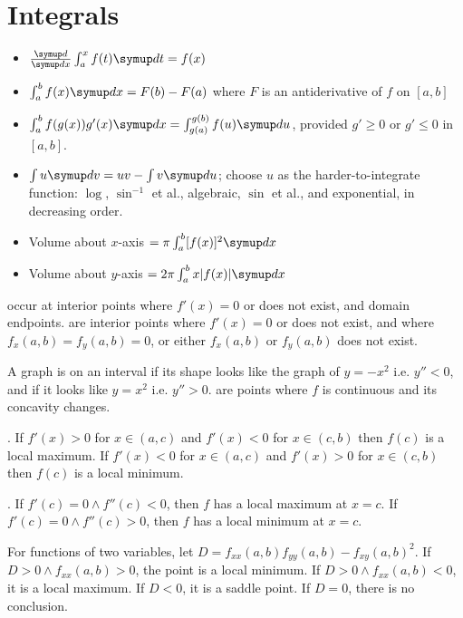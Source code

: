 \documentclass{slnotes}
\begin{document}
\section{Integrals}
\begin{itemize}
\item \(\frac{\sld}{\sld{x}}\int^x_a f(t)\sld t = f(x)\)
\item \(\int^b_a f(x)\sld{x} = F(b) - F(a)\) where \(F\) is an antiderivative of \(f\) on \([a, b]\)
\item \(\int^b_a f(g(x))g'(x)\sld{x} = \int^{g(b)}_{g(a)}f(u)\sld u\), provided \(g' \ge 0\) or \(g' \le 0\) in \([a, b]\).
\item \(\int u \sld v = uv - \int v \sld u\); choose \(u\) as the harder-to-integrate function: \(\log\), \(\sin^{-1}\) et al., algebraic, \(\sin\) et al., and exponential, in decreasing order.
\item Volume about \(x\)-axis \(= \pi\int^b_a[f(x)]^2\sld x\)
\item Volume about \(y\)-axis \(= 2\pi\int^b_a x\lvert f(x) \rvert\sld x\)
\end{itemize}

 occur at interior points where \(f'(x) = 0\) or does not exist, and domain endpoints.  are interior points where \(f'(x) = 0\) or does not exist, and where \(f_x(a, b) = f_y(a, b) = 0\), or either \(f_x(a, b)\) or \(f_y(a, b)\) does not exist.

A graph is  on an interval if its shape looks like the graph of \(y = -x^2\) i.e. \(y'' < 0\), and  if it looks like \(y = x^2\) i.e. \(y'' > 0\).  are points where \(f\) is continuous and its concavity changes.

. If \(f'(x) > 0\) for \(x \in (a, c)\) and \(f'(x) < 0\) for \(x \in (c, b)\) then \(f(c)\) is a local maximum. If \(f'(x) < 0\) for \(x \in (a, c)\) and \(f'(x) > 0\) for \(x \in (c, b)\) then \(f(c)\) is a local minimum.

. If \(f'(c) = 0 \land f''(c) < 0\), then \(f\) has a local maximum at \(x = c\). If \(f'(c) = 0 \land f''(c) > 0\), then \(f\) has a local minimum at \(x = c\).

For functions of two variables, let \(D = f_{xx}(a,b)f_{yy}(a,b) - f_{xy}(a,b)^2\). If \(D > 0 \land f_{xx}(a, b) > 0\), the point is a local minimum. If \(D > 0 \land f_{xx}(a, b) < 0\), it is a local maximum. If \(D < 0\), it is a saddle point. If \(D = 0\), there is no conclusion.
\end{document}
